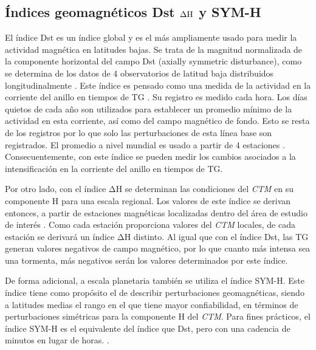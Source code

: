\subsection{Índices geomagnéticos Dst $\Delta {\rm H}$ y SYM-H}
El índice Dst es un índice global y es el más ampliamente usado para medir la actividad magnética en latitudes bajas. Se trata de la magnitud normalizada de la componente horizontal del campo Dst (axially symmetric disturbance), como se determina de los datos de 4 observatorios de latitud baja distribuidos longitudinalmente \cite{l_handbook_geof_sw_Geom_field}. Este índice es pensado como una medida de la actividad en la corriente del anillo en tiempos de TG \cite{gombosi_1998}. Su registro es medido cada hora. Los días quietos de cada año son utilizados para establecer un promedio mínimo de la actividad en esta corriente, así como del campo magnético de fondo. Esto se resta de los registros por lo que solo las perturbaciones de esta línea base son registrados. El promedio a nivel mundial es usado a partir de 4 estaciones \cite{hargreaves_1992}. Consecuentemente, con este índice se pueden medir los cambios asociados a la intensificación en la corriente del anillo en tiempos de TG.
\vspace{1 em}

Por otro lado, con el índice $\mathrm{\Delta H}$ se determinan las condiciones del \emph{CTM} en su componente H para una escala regional. Los valores de este índice se derivan entonces, a partir de estaciones magnéticas localizadas dentro del área de estudio de interés \cite{l_handbook_geof_sw_Geom_field}. Como cada estación proporciona valores del \emph{CTM} locales, de cada estación se derivará un índice $\mathrm{\Delta H}$ distinto. Al igual que con el índice Dst, las TG generan valores negativos de campo magnético, por lo que cuanto más intensa sea una tormenta, más negativos serán los valores determinados por este índice.
\vspace{1 em}



De forma adicional, a escala planetaria también se utiliza el índice SYM-H. Este índice tiene como propósito el de describir perturbaciones geomagnéticas, siendo a latitudes medias el rango en el que tiene mayor confiabilidad, en términos de perturbaciones simétricas para la componente H del \emph{CTM}. Para fines prácticos, el índice SYM-H es el equivalente del índice que Dst, pero con una cadencia de minutos en lugar de horas. \cite{idx}.\\
\vspace{1 em}

